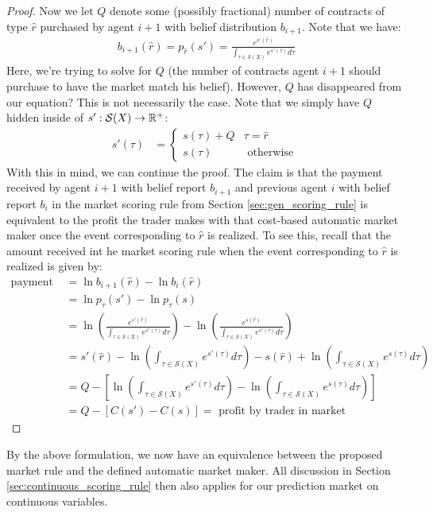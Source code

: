 \begin{proof}
Now we let $Q$ denote some (possibly fractional) number of contracts of type $\hat{r}$ purchased by agent $i+1$ with belief distribution $b_{i+1}$. Note that we have:
\begin{align}
b_{i+1}(\hat{r}) = p_{\hat{r}}(s') = \frac{e^{s'(\hat{r})}}{\int_{\tau \in \mathcal{S}(X)} e^{s'(\tau)} d\tau}
\end{align}
Here, we're trying to solve for $Q$ (the number of contracts agent $i+1$ should purchase to have the market match his belief). However, $Q$ has disappeared from our equation? This is not necessarily the case. Note that we simply have $Q$ hidden inside of $s': \mathcal{S}(X) \to \mathbb{R}^+$:
\begin{align}
   s'(\tau) &= 
   \begin{cases} 
      s(\tau) + Q & \tau = \hat{r} \\
      s(\tau) & \text{ otherwise } 
   \end{cases}
\end{align}
With this in mind, we can continue the proof. The claim is that the payment received by agent $i+1$ with belief report $b_{i+1}$ and previous agent $i$ with belief report $b_{i}$ in the market scoring rule from Section \ref{sec:gen_scoring_rule} is equivalent to the profit the trader makes with that cost-based automatic market maker once the event corresponding to $\hat{r}$ is realized. To see this, recall that the amount received int he market scoring rule when the event corresponding to $\hat{r}$ is realized is given by:
\begin{align}
\text{payment in market rule } &= \ln b_{i+1}(\hat{r}) - \ln b_{i}(\hat{r}) \\
&= \ln p_{\tau}(s') - \ln p_{\tau}(s) \\
&= \ln \left( \frac{e^{s'(\hat{r})}}{\int_{\tau \in \mathcal{S}(X)} e^{s'(\tau)} d\tau}\right) - \ln \left( \frac{e^{s(\hat{r})}}{\int_{\tau \in \mathcal{S}(X)} e^{s'(\tau)} d\tau}\right) \\
&= s'(\hat{r}) - \ln \left( \int_{\tau \in \mathcal{S}(X)} e^{s'(\tau)} d\tau\right) - s(\hat{r}) + \ln \left(\int_{\tau \in \mathcal{S}(X)} e^{s(\tau)} d\tau \right) \\
&= Q - \left[ \ln \left( \int_{\tau \in \mathcal{S}(X)} e^{s'(\tau)} d\tau\right) - \ln \left(\int_{\tau \in \mathcal{S}(X)} e^{s(\tau)} d\tau \right)  \right] \\
&= Q - [C(s') - C(s)] = \text{ profit by trader in market}
\end{align}
\end{proof}
By the above formulation, we now have an equivalence between the proposed market rule and the defined automatic market maker. All discussion in Section \ref{sec:continuous_scoring_rule} then also applies for our prediction market on continuous variables. 

